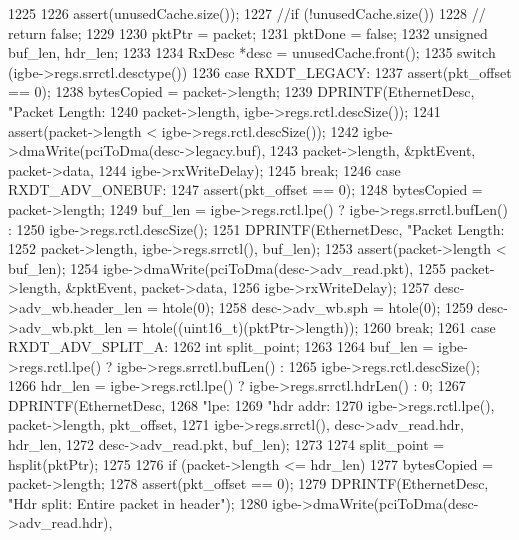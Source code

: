 \begin{DoxyCode}
1225 {
1226     assert(unusedCache.size());
1227     //if (!unusedCache.size())
1228     //    return false;
1229 
1230     pktPtr = packet;
1231     pktDone = false;
1232     unsigned buf_len, hdr_len;
1233 
1234     RxDesc *desc = unusedCache.front();
1235     switch (igbe->regs.srrctl.desctype()) {
1236       case RXDT_LEGACY:
1237         assert(pkt_offset == 0);
1238         bytesCopied = packet->length;
1239         DPRINTF(EthernetDesc, "Packet Length: %
1240                 packet->length, igbe->regs.rctl.descSize());
1241         assert(packet->length < igbe->regs.rctl.descSize());
1242         igbe->dmaWrite(pciToDma(desc->legacy.buf),
1243                        packet->length, &pktEvent, packet->data,
1244                        igbe->rxWriteDelay);
1245         break;
1246       case RXDT_ADV_ONEBUF:
1247         assert(pkt_offset == 0);
1248         bytesCopied = packet->length;
1249         buf_len = igbe->regs.rctl.lpe() ? igbe->regs.srrctl.bufLen() :
1250             igbe->regs.rctl.descSize();
1251         DPRINTF(EthernetDesc, "Packet Length: %
1252                 packet->length, igbe->regs.srrctl(), buf_len);
1253         assert(packet->length < buf_len);
1254         igbe->dmaWrite(pciToDma(desc->adv_read.pkt),
1255                        packet->length, &pktEvent, packet->data,
1256                        igbe->rxWriteDelay);
1257         desc->adv_wb.header_len = htole(0);
1258         desc->adv_wb.sph = htole(0);
1259         desc->adv_wb.pkt_len = htole((uint16_t)(pktPtr->length));
1260         break;
1261       case RXDT_ADV_SPLIT_A:
1262         int split_point;
1263         
1264         buf_len = igbe->regs.rctl.lpe() ? igbe->regs.srrctl.bufLen() :
1265             igbe->regs.rctl.descSize();
1266         hdr_len = igbe->regs.rctl.lpe() ? igbe->regs.srrctl.hdrLen() : 0; 
1267         DPRINTF(EthernetDesc,
1268                 "lpe: %
1269                 "hdr addr: %
1270                 igbe->regs.rctl.lpe(), packet->length, pkt_offset,
1271                 igbe->regs.srrctl(), desc->adv_read.hdr, hdr_len,
1272                 desc->adv_read.pkt, buf_len);
1273 
1274         split_point = hsplit(pktPtr);
1275 
1276         if (packet->length <= hdr_len) {
1277             bytesCopied = packet->length;
1278             assert(pkt_offset == 0);
1279             DPRINTF(EthernetDesc, "Hdr split: Entire packet in header\n");
1280             igbe->dmaWrite(pciToDma(desc->adv_read.hdr),
}}}
\end{DoxyCode}
